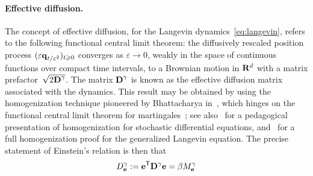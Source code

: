 \documentclass[11pt,a4paper]{article}
\begin{document}

\paragraph{Effective diffusion.}
The concept of effective diffusion,
for the Langevin dynamics~\eqref{eq:langevin},
refers to the following functional central limit theorem:
the diffusively rescaled position process $(\varepsilon \boldsymbol{\mathbf q}_{t/\varepsilon^2})_{t\geqslant0}$ converges as $\varepsilon \to 0$,
weakly in the space of continuous functions over compact time intervals,
to a Brownian motion in $\mathbf R^d$ with a matrix prefactor~$\sqrt{2 \boldsymbol{\mathbf D}^{\gamma}}$.
The matrix $\boldsymbol{\mathbf D}^{\gamma}$ is known as the effective diffusion matrix associated with the dynamics.
This result may be obtained by using the homogenization technique pioneered by Bhattacharya in~\cite{MR663900},
which hinges on the functional central limit theorem for martingales~\cite{MR668684};
see also~\cite[Chapter 18]{pavliotis2008multiscale} for a pedagogical presentation of homogenization for stochastic differential equations,
and~\cite[Theorem 2.5]{MR2793823} for a full homogenization proof for the generalized Langevin equation.
The precise statement of Einstein's relation is then that
\[
    D^{\gamma}_{\boldsymbol{\mathbf e}} := \boldsymbol{\mathbf e}^\mathsf T \boldsymbol{\mathbf D}^{\gamma} \boldsymbol{\mathbf e} = \beta M^{\gamma}_{\boldsymbol{\mathbf e}}
\]
\end{document}
